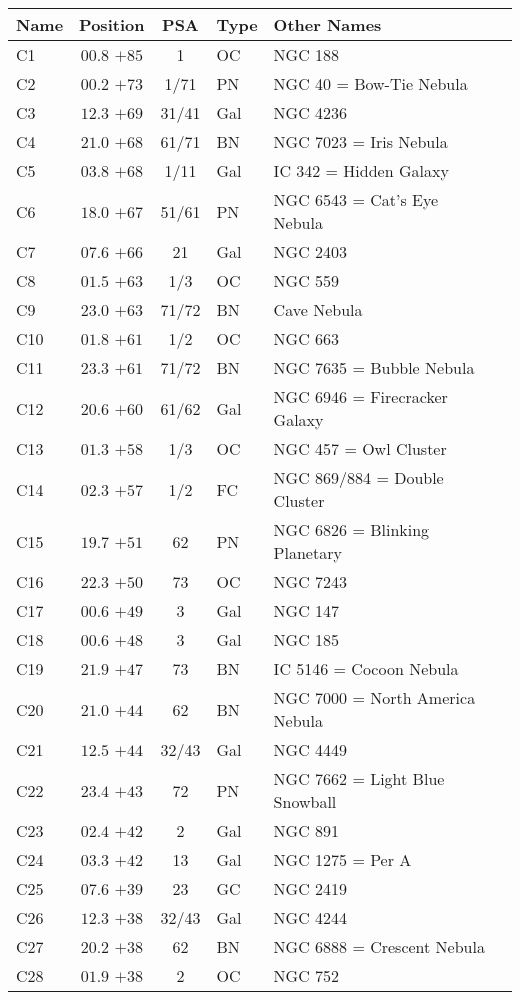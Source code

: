 \begin{table}[p]
\setlength{\tabcolsep}{2pt}
\small
\begin{tabular}{lcclll}
\hline
Name&Position&PSA&Type&Other Names\\
\hline
C1   &$00.8$ $+85$&1&OC &NGC 188\\
C2   &$00.2$ $+73$&1/71&PN &NGC 40 = Bow-Tie Nebula\\
C3   &$12.3$ $+69$&31/41&Gal&NGC 4236\\
C4   &$21.0$ $+68$&61/71&BN &NGC 7023 = Iris Nebula\\
C5   &$03.8$ $+68$&1/11&Gal&IC 342 = Hidden Galaxy\\
C6   &$18.0$ $+67$&51/61&PN &NGC 6543 = Cat's Eye Nebula\\
C7   &$07.6$ $+66$&21&Gal&NGC 2403\\
C8   &$01.5$ $+63$&1/3&OC &NGC 559\\
C9   &$23.0$ $+63$&71/72&BN &Cave Nebula\\
C10  &$01.8$ $+61$&1/2&OC &NGC 663\\
C11  &$23.3$ $+61$&71/72&BN &NGC 7635 = Bubble Nebula\\
C12  &$20.6$ $+60$&61/62&Gal&NGC 6946 = Firecracker Galaxy\\
C13  &$01.3$ $+58$&1/3&OC &NGC 457 = Owl Cluster\\
C14  &$02.3$ $+57$&1/2&FC &NGC 869/884 = Double Cluster\\
C15  &$19.7$ $+51$&62&PN &NGC 6826 = Blinking Planetary\\
C16  &$22.3$ $+50$&73&OC &NGC 7243\\
C17  &$00.6$ $+49$&3&Gal&NGC 147\\
C18  &$00.6$ $+48$&3&Gal&NGC 185\\
C19  &$21.9$ $+47$&73&BN &IC 5146 = Cocoon Nebula\\
C20  &$21.0$ $+44$&62&BN &NGC 7000 = North America Nebula\\
C21  &$12.5$ $+44$&32/43&Gal&NGC 4449\\
C22  &$23.4$ $+43$&72&PN &NGC 7662 = Light Blue Snowball\\
C23  &$02.4$ $+42$&2&Gal&NGC 891\\
C24  &$03.3$ $+42$&13&Gal&NGC 1275 = Per A\\
C25  &$07.6$ $+39$&23&GC &NGC 2419\\
C26  &$12.3$ $+38$&32/43&Gal&NGC 4244\\
C27  &$20.2$ $+38$&62&BN &NGC 6888 = Crescent Nebula\\
C28  &$01.9$ $+38$&2&OC &NGC 752\\

\end{tabular}
\end{table}
